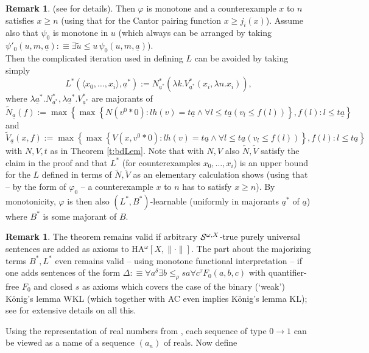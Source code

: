 \documentclass[1p]{elsarticle}
\theoremstyle{plain}
\theoremstyle{definition}
\newtheorem{rmk}[thm]{Remark}
\theoremstyle{remark}
\theoremstyle{definition}
\begin{document}
{\begin{rmk}
(see \cite{Kohlenbach(book)} for details).  Then 
$\varphi$ is monotone and a counterexample $x$ to $n$ satisfies 
$x\ge n$ (using that for the Cantor pairing function $x\ge j_i(x)$). 
Assume also that $\psi_0$ is 
monotone in $u$ (which always can be arranged by taking 
$\psi'_0(u,m,\underline{a}):\equiv \exists \tilde{u}\le u\,\psi_0
(u,m,\underline{a})$). \\ 
Then the complicated iteration used in defining 
$L$ can be avoided by taking simply 
\[ L^*(\langle x_0,\ldots,x_i\rangle,\underline{a}^*):= 
N^*_{\underline{a}^*}(\lambda k.V^*_{\underline{a}^*}(x_i,
\lambda n.x_i)), \] 
where $\lambda \underline{a}^*.N^*_{\underline{a}^*},\lambda \underline{a}^*.
V^*_{\underline{a}^*}$ are majorants of 
\[ \tilde{N}_{\underline{a}}(f):=\max\left\{ \max\left\{ 
N(v^0*0):lh(v)=t\underline{a}\wedge \forall l\le t\underline{a}(v_l\le f(l))
\right\},f(l):l\le t\underline{a}\right\}\] and 
\[ \tilde{V}_{\underline{a}}(x,f):=\max\left\{ \max\left\{ 
V(x,v^0*0):lh(v)=t\underline{a}\wedge \forall l\le t\underline{a}(v_l\le f(l))
\right\},f(l):l\le t\underline{a}\right\}\] 
with $N,V,t$ as in Theorem \ref{t:bdLem}. Note that with $N,V$ also 
$\tilde{N},\tilde{V}$ satisfy the claim in the proof and that $L^*$ 
(for counterexamples $x_0,\ldots,x_i$) is 
an upper bound for the $L$ defined in terms of $\tilde{N},\tilde{V}$ as 
an elementary calculation shows (using that -- by the form of 
$\varphi_0$ -- a counterexample $x$ to $n$ has to satisfy $x\ge n$). 
By monotonicity, $\varphi$ is then also $(L^*,B^*)$-learnable (uniformly 
in majorants $\underline{a}^*$ of $\underline{a}$) where $B^*$ is some 
majorant of $B.$ 
\end{rmk}  
\begin{rmk} The theorem remains valid if arbitrary ${\cal S}^{\omega,X }$-true 
purely universal sentences are added as axioms to 
{\rm HA$^{\omega}[X,\|\cdot\|]$}. The part about the majorizing terms $B^*,L^*$ 
even remains valid -- using monotone functional interpretation -- 
if one adds sentences of the form $\Delta:\equiv 
\forall a^{\delta}\exists b\le_{\rho} sa\forall c^{\tau} 
F_0(a,b,c)$ with quantifier-free 
$F_0$ and closed $s$ as axioms which covers the case of the binary (`weak') K\"onig's lemma 
WKL (which together with AC even implies K\"onig's lemma KL); see 
\cite{Kohlenbach(book)} for extensive details on all this.
\end{rmk}
Using the representation of real numbers from 
\cite{Kohlenbach(book)}, each sequence of type $0\to 1$ can be viewed 
as a name of a sequence $(a_n)$ of reals. Now define 
}
\end{document}
